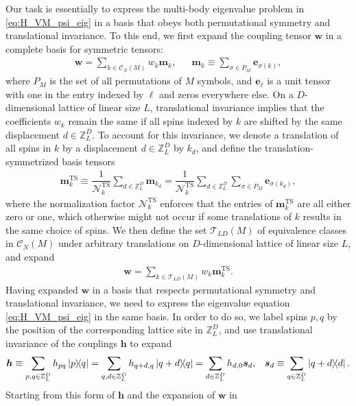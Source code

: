 \documentclass[nofootinbib,notitlepage,11pt]{revtex4-2}
\renewcommand{\t}{\text} %
\newcommand{\f}[2]{\dfrac{#1}{#2}} %
\newcommand{\p}[1]{\left(#1\right)} %
\newcommand{\m}{\bm} %
\newcommand{\1}{\mathds{1}}
\newcommand{\C}{\mathcal{C}}
\newcommand{\N}{\mathcal{N}}
\newcommand{\T}{\mathcal{T}}
\newcommand{\ZZ}{\mathbb{Z}}
\begin{document}
Our task is essentially to express the multi-body eigenvalue problem
in \eqref{eq:H_VM_psi_eig} in a basis that obeys both permutational
symmetry and translational invariance.  To this end, we first expand
the coupling tensor $\m w$ in a complete basis for symmetric tensors:
\begin{align}
  \m w = \sum_{k\in\C_N\p{M}} w_k \m m_k,
  &&
  \m m_k \equiv \sum_{\sigma\in P_M} \m e_{\sigma\p{k}},
  \label{eq:sym_tensor}
\end{align}
where $P_M$ is the set of all permutations of $M$ symbols, and
$\m e_\ell$ is a unit tensor with one in the entry indexed by $\ell$
and zeros everywhere else.  On a $D$-dimensional lattice of linear
size $L$, translational invariance implies that the coefficients $w_k$
remain the same if all spins indexed by $k$ are shifted by the same
displacement $d\in\ZZ_L^D$.  To account for this invariance, we denote
a translation of all spins in $k$ by a displacement $d\in\ZZ_L^D$ by
$k_d$, and define the translation-symmetrized basis tensors
\begin{align}
  \m m_k^{\t{TS}}
  \equiv \f1{\N_k^{\t{TS}}} \sum_{d\in\ZZ_L^D} \m m_{k_d}
  = \f1{\N_k^{\t{TS}}} \sum_{d\in\ZZ_L^D} \sum_{\sigma\in P_M}
  \m e_{\sigma(k_d)},
\end{align}
where the normalization factor $\N_k^{\t{TS}}$ enforces that the
entries of $\m m_k^{\t{TS}}$ are all either zero or one, which
otherwise might not occur if some translations of $k$ results in the
same choice of spins.  We then define the set $\T_{LD}\p{M}$ of
equivalence classes in $\C_N\p{M}$ under arbitrary translations on
$D$-dimensional lattice of linear size $L$, and expand
\begin{align}
  \m w = \sum_{k\in\T_{LD}\p{M}} w_k \m m_k^{\t{TS}}.
  \label{eq:sym_shift_tensor}
\end{align}
Having expanded $\m w$ in a basis that respects permutational symmetry
and translational invariance, we need to express the eigenvalue
equation \eqref{eq:H_VM_psi_eig} in the same basis.  In order to do
so, we label spins $p,q$ by the position of the corresponding lattice
site in $\ZZ_L^D$, and use translational invariance of the couplings
$\m h$ to expand
\begin{align}
  \m h \equiv \sum_{p,q\in\ZZ_L^D} h_{pq} \op{p}{q}
  = \sum_{q,d\in\ZZ_L^D} h_{q+d,q} \op{q+d}{q}
  = \sum_{d\in\ZZ_L^D} h_{d,0} \m s_d,
  &&
  \m s_d \equiv \sum_{q\in\ZZ_L^D} \op{q+d}{d}.
\end{align}
Starting from this form of $\m h$ and the expansion of $\m w$ in
\end{document}
